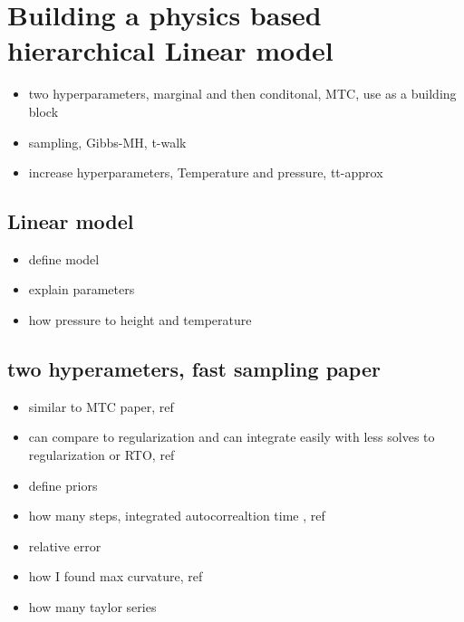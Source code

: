 
\chapter{Building a physics based hierarchical Linear model}
\begin{itemize}
	\item two hyperparameters, marginal and then conditonal, MTC, use as a building block
	\item  sampling, Gibbs-MH, t-walk
	\item increase hyperparameters, Temperature and pressure, tt-approx
\end{itemize}

\section{Linear model}
\begin{itemize}
	\item define model
	\item explain parameters
	\item how pressure to height and temperature
\end{itemize}

\section{two hyperameters, fast sampling paper}
\begin{itemize}
	\item similar to MTC paper, ref
	\item can compare to regularization and can integrate easily with less solves to regularization or RTO, ref
	\item define priors
	\item how many steps, integrated autocorrealtion time , ref
	\item relative error
	\item how I found max curvature, ref
	\item how many taylor series
\end{itemize}

